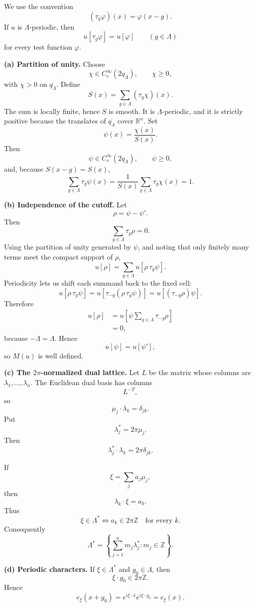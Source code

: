 \begin{solution}
We use the convention
\[
(\tau_g\varphi)(x)=\varphi(x-g).
\]
If \(u\) is \(\Lambda\)-periodic, then
\[
u[\tau_g\varphi]=u[\varphi]
\qquad(g\in\Lambda)
\]
for every test function \(\varphi\).

\par\smallskip\noindent\textbf{(a) Partition of unity.}
Choose
\[
\chi\in C_c^\infty(2q_\Lambda),
\qquad
\chi\ge0,
\]
with \(\chi>0\) on \(\overline{q_\Lambda}\). Define
\[
S(x)
=
\sum_{g\in\Lambda}
(\tau_g\chi)(x).
\]
The sum is locally finite, hence \(S\) is smooth. It is
\(\Lambda\)-periodic, and it is strictly positive because the translates
of \(\overline{q_\Lambda}\) cover \(\mathbb R^n\). Set
\[
\psi(x)=\frac{\chi(x)}{S(x)}.
\]
Then
\[
\psi\in C_c^\infty(2q_\Lambda),
\qquad
\psi\ge0,
\]
and, because \(S(x-g)=S(x)\),
\[
\sum_{g\in\Lambda}\tau_g\psi(x)
=
\frac1{S(x)}
\sum_{g\in\Lambda}\tau_g\chi(x)
=
1.
\]

\par\smallskip\noindent\textbf{(b) Independence of the cutoff.}
Let
\[
\rho=\psi-\psi'.
\]
Then
\[
\sum_{g\in\Lambda}\tau_g\rho=0.
\]
Using the partition of unity generated by \(\psi\), and noting that only
finitely many terms meet the compact support of \(\rho\),
\[
u[\rho]
=
\sum_{g\in\Lambda}
u[\rho\,\tau_g\psi].
\]
Periodicity lets us shift each summand back to the fixed cell:
\[
u[\rho\,\tau_g\psi]
=
u[\tau_{-g}(\rho\,\tau_g\psi)]
=
u[(\tau_{-g}\rho)\psi].
\]
Therefore
\[
\begin{aligned}
u[\rho]
&=
u\left[
\psi
\sum_{g\in\Lambda}\tau_{-g}\rho
\right]\\
&=0,
\end{aligned}
\]
because \(-\Lambda=\Lambda\). Hence
\[
u[\psi]=u[\psi'],
\]
so \(M(u)\) is well defined.

\par\smallskip\noindent\textbf{(c) The \(2\pi\)-normalized dual lattice.}
Let \(L\) be the matrix whose columns are
\(\lambda_1,\dots,\lambda_n\). The Euclidean dual basis has columns
\[
L^{-T},
\]
so
\[
\mu_j\cdot\lambda_k=\delta_{jk}.
\]
Put
\[
\lambda_j^*=2\pi\mu_j.
\]
Then
\[
\lambda_j^*\cdot\lambda_k
=
2\pi\delta_{jk}.
\]

If
\[
\xi=\sum_j a_j\mu_j,
\]
then
\[
\lambda_k\cdot\xi=a_k.
\]
Thus
\[
\xi\in\Lambda^*
\iff
a_k\in2\pi\mathbb Z
\quad\text{for every }k.
\]
Consequently
\[
\boxed{
\Lambda^*
=
\left\{
\sum_{j=1}^n
m_j\lambda_j^*:
m_j\in\mathbb Z
\right\}.
}
\]

\par\smallskip\noindent\textbf{(d) Periodic characters.}
If \(\xi\in\Lambda^*\) and \(g_0\in\Lambda\), then
\[
\xi\cdot g_0\in2\pi\mathbb Z.
\]
Hence
\[
e_\xi(x+g_0)
=
e^{i\xi\cdot x}
e^{i\xi\cdot g_0}
=
e_\xi(x).
\]


\end{solution}
